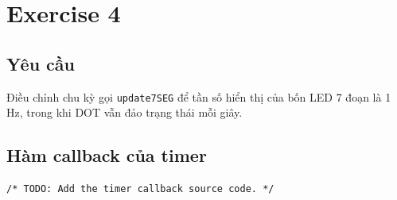 \section{Exercise 4}

\subsection{Yêu cầu}
Điều chỉnh chu kỳ gọi \texttt{update7SEG} để tần số hiển thị của bốn LED 7 đoạn
là 1 Hz, trong khi DOT vẫn đảo trạng thái mỗi giây.

\subsection{Hàm callback của timer}
\begin{lstlisting}[caption={Timer callback -- Exercise 4}]
/* TODO: Add the timer callback source code. */
\end{lstlisting}

